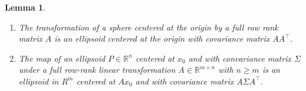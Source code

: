 \documentclass{article}
\newtheorem{lemma}[theorem]{Lemma}
\begin{document}
\begin{lemma}
	\label{lemma:ellipsoid_transformation}
	\begin{enumerate}[label=(\roman*)]
	\item The transformation of a sphere centered at the origin by a full row rank matrix \(A\) is an ellipsoid centered at the origin with covariance matrix \(A A^{\top}\). 
	
	\item The map of an ellipsoid $P \in \mathbb{R}^n$ centered at \(x_0\) and with convariance matrix \(\Sigma\) under a full row-rank linear transformation $A \in \mathbb{R}^{m \times n}$ with $n \geq m$ is an ellipsoid in $R^m$ centered at \(A x_0\) and with covariance matrix \(A \Sigma A^{\top}\).
	\end{enumerate}
\end{lemma}
\end{document}
